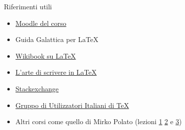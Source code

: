 \begin{frame}{Riferimenti utili}
    \begin{itemize}
      \item{\href{https://elearning.unipd.it/math/course/view.php?id=252}
      {Moodle del corso}}
      \item Guida Galattica per \LaTeX{}
      \item {\href{https://en.wikibooks.org/wiki/LaTeX/}{Wikibook su LaTeX}}
      \item {\href{http://www.lorenzopantieri.net/LaTeX_files/ArteLaTeX.pdf}
{L'arte di scrivere in LaTeX}}
      \item {\href{https://tex.stackexchange.com/}{Stackexchange}}
      \item {\href{http://www.guitex.org/}
{Gruppo di Utilizzatori Italiani di TeX}}
      \item Altri corsi come quello di Mirko Polato (lezioni 
{\href{http://www.math.unipd.it/~mpolato/didattica/latex/lesson_1.pdf}{1}}
{\href{http://www.math.unipd.it/~mpolato/didattica/latex/lesson_2.pdf}{2}}
e {\href{http://www.math.unipd.it/~mpolato/didattica/latex/lesson_3.pdf}{3}})
    \end{itemize}
\end{frame}
